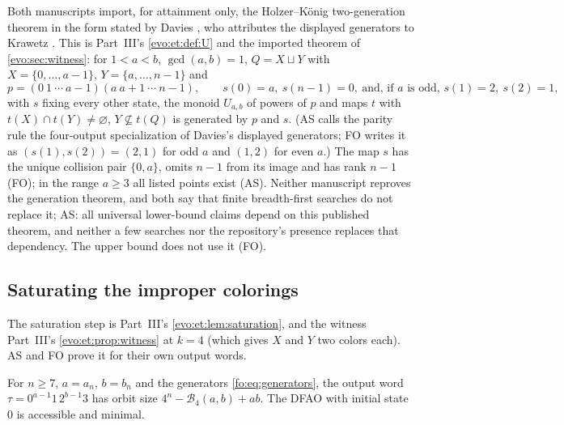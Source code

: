 \documentclass[11pt,a4paper]{article}
\numberwithin{equation}{section}
\theoremstyle{definition}
\theoremstyle{remark}
\newcommand{\Bip}{\mathcal B}
\begin{document}
Both manuscripts import, for attainment only, the Holzer--K\"onig
two-generation theorem \cite[Theorem~8]{HolzerKoenig2004} in the form stated
by Davies \cite[Section~3, printed p.~7]{Davies2017}, who attributes the
displayed generators to Krawetz \cite{Krawetz2003}. This is Part~III's
\cref{evo:et:def:U} and the imported theorem of \cref{evo:sec:witness}: for
$1<a<b$, $\gcd(a,b)=1$, $Q=X\sqcup Y$ with $X=\{0,\ldots,a-1\}$,
$Y=\{a,\ldots,n-1\}$ and
\begin{equation}\label{fo:eq:generators}
 p=(0\ 1\ \cdots\ a-1)(a\ a+1\ \cdots\ n-1),\qquad
 s(0)=a,\ s(n-1)=0,\ \text{and, if $a$ is odd, }s(1)=2,\ s(2)=1,
\end{equation}
with $s$ fixing every other state, the monoid $U_{a,b}$ of powers of $p$ and
maps $t$ with $t(X)\cap t(Y)\ne\varnothing$, $Y\not\subseteq t(Q)$ is
generated by $p$ and $s$. (AS calls the parity rule the four-output
specialization of Davies's displayed generators; FO writes it as
$(s(1),s(2))=(2,1)$ for odd $a$ and $(1,2)$ for even $a$.) The map $s$ has the
unique collision pair $\{0,a\}$, omits $n-1$ from its image and has rank $n-1$
(FO); in the range $a\ge3$ all listed points exist (AS). Neither manuscript
reproves the generation theorem, and both say that finite breadth-first
searches do not replace it; AS: all universal lower-bound claims depend on
this published theorem, and neither a few searches nor the repository's
presence replaces that dependency. The upper bound does not use it (FO).

\subsection{Saturating the improper colorings}

The saturation step is Part~III's \cref{evo:et:lem:saturation}, and the
witness Part~III's \cref{evo:et:prop:witness} at $k=4$ (which gives $X$ and $Y$
two colors each). AS and FO prove it for their own output words.

\begin{proposition}\label{fo:as:prop:attainment}
For $n\ge7$, $a=a_n$, $b=b_n$ and the generators \eqref{fo:eq:generators}, the
output word $\tau=0^{a-1}1\,2^{b-1}3$ has orbit size
$4^n-\Bip_4(a,b)+ab$. The DFAO with initial state $0$ is accessible and
minimal.
\end{proposition}
\end{document}
